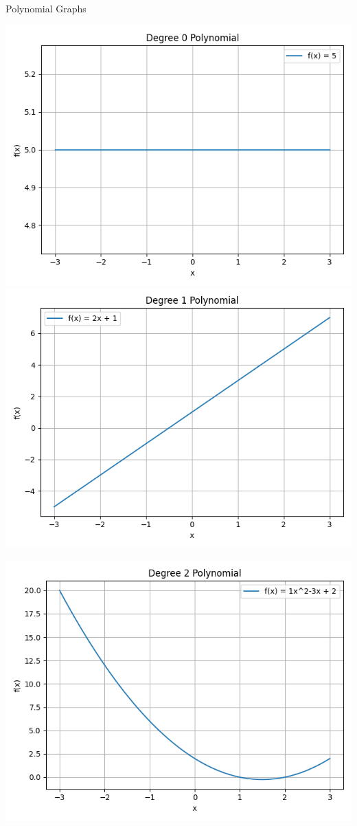 \documentclass{beamer}
\begin{document}
\begin{frame}{Polynomial Graphs}
  \centering
  \begin{minipage}[t]{0.45\textwidth}
    \centering
    \includegraphics[width=0.9\linewidth]{polynomial_degree_0.png}\\[1mm]
    \includegraphics[width=0.9\linewidth]{polynomial_degree_1.png}\\[1mm]
  \end{minipage}
  \begin{minipage}[t]{0.45\textwidth}
    \centering
    \includegraphics[width=0.9\linewidth]{polynomial_degree_2.png}
  \end{minipage}
\end{frame}
\end{document}
